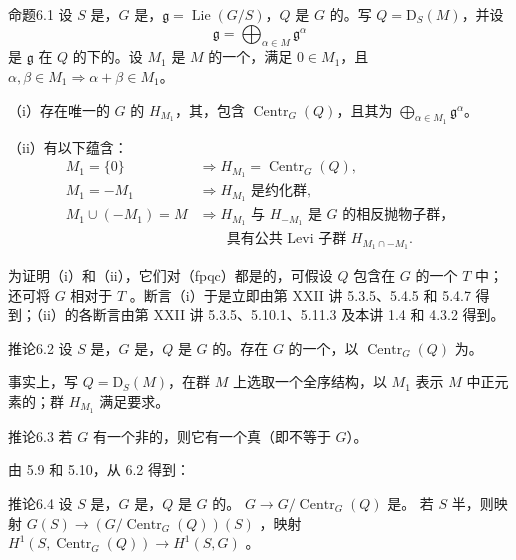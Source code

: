 \begin{SGAresult}{命题}{6.1}
设 $S$ 是，$G$ 是，$\mathfrak g=\operatorname{Lie}(G/S)$，$Q$ 是 $G$ 的。写 $Q=\mathrm D_S(M)$，并设
\[
 \mathfrak g=\bigoplus_{\alpha\in M}\mathfrak g^\alpha
\]
是 $\mathfrak g$ 在 $Q$ 的下的。设 $M_1$ 是 $M$ 的一个，满足 $0\in M_1$，且 $\alpha,\beta\in M_1\Rightarrow\alpha+\beta\in M_1$。

（i）存在唯一的 $G$ 的 $H_{M_1}$，其，包含 $\operatorname{Centr}_G(Q)$，且其为 $\bigoplus_{\alpha\in M_1}\mathfrak g^\alpha$。

（ii）有以下蕴含：
\begin{align*}
 M_1=\{0\}&\Longrightarrow H_{M_1}=\operatorname{Centr}_G(Q),\\
 M_1=-M_1&\Longrightarrow H_{M_1}\text{ 是约化群},\\
 M_1\cup(-M_1)=M&\Longrightarrow H_{M_1}\text{ 与 }H_{-M_1}\text{ 是 }G\text{ 的相反抛物子群，}\\
 &\hspace{2em}\text{具有公共 Levi 子群 }H_{M_1\cap-M_1}.
\end{align*}
\end{SGAresult}
为证明（i）和（ii），它们对（fpqc）都是的，可假设 $Q$ 包含在 $G$ 的一个 $T$ 中；还可将 $G$ 相对于 $T$ 。断言（i）于是立即由第 XXII 讲 5.3.5、5.4.5 和 5.4.7 得到；（ii）的各断言由第 XXII 讲 5.3.5、5.10.1、5.11.3 及本讲 1.4 和 4.3.2 得到。

\begin{SGAresult}{推论}{6.2}
设 $S$ 是，$G$ 是，$Q$ 是 $G$ 的。存在 $G$ 的一个，以 $\operatorname{Centr}_G(Q)$ 为。
\end{SGAresult}
事实上，写 $Q=\mathrm D_S(M)$，在群 $M$ 上选取一个全序结构，以 $M_1$ 表示 $M$ 中正元素的；群 $H_{M_1}$ 满足要求。
\begin{SGAresult}{推论}{6.3}
若 $G$ 有一个非的，则它有一个真（即不等于 $G$）。
\end{SGAresult}
由 5.9 和 5.10，从 6.2 得到：
\begin{SGAresult}{推论}{6.4}
设 $S$ 是，$G$ 是，$Q$ 是 $G$ 的。 $G\to G/\operatorname{Centr}_G(Q)$ 是。
若 $S$ 半，则映射 $G(S)\to(G/\operatorname{Centr}_G(Q))(S)$ ，映射 $H^1(S,\operatorname{Centr}_G(Q))\to H^1(S,G)$ 。
\end{SGAresult}

